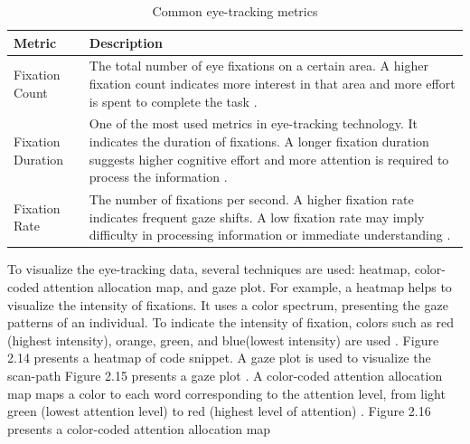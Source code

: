 \begin{table}[H]
\centering
\small %
\caption{Common eye-tracking metrics}
\label{tab:eye_tracking_metrics}
\begin{tabular}{p{} | p{}}
\textbf{Metric} & \textbf{Description} \\
\hline
Fixation Count & The total number of eye fixations on a certain area. A higher fixation count indicates more interest in that area and more effort is spent to complete the task \cite{obaidellah2018survey}. \\
\hline
Fixation Duration & One of the most used metrics in eye-tracking technology. It indicates the duration of fixations. A longer fixation duration suggests higher cognitive effort and more attention is required to process the information \cite{junior5005089understanding}. \\
\hline
Fixation Rate & The number of fixations per second. A higher fixation rate indicates frequent gaze shifts. A low fixation rate may imply difficulty in processing information or immediate understanding \cite{bauer2017indentations}. \\
\end{tabular}
\end{table}






To visualize the eye-tracking data, several techniques are used: heatmap, color-coded attention allocation map, and gaze plot. For example, a heatmap helps to visualize the intensity of fixations. It uses a color spectrum, presenting the gaze patterns of an individual. 
To indicate the intensity of fixation, colors such as red (highest intensity), orange, green, and blue(lowest intensity) are used \cite{sharafi2015systematic}. Figure 2.14 presents a heatmap of code snippet. A gaze plot is used to visualize the scan-path Figure 2.15 presents a gaze plot \cite{sharafi2015systematic}. A color-coded attention allocation map maps a color to each word corresponding to the attention level, from light green (lowest attention level) to red (highest level of attention) \cite{sharafi2015systematic}.
Figure 2.16 presents a color-coded attention allocation map

